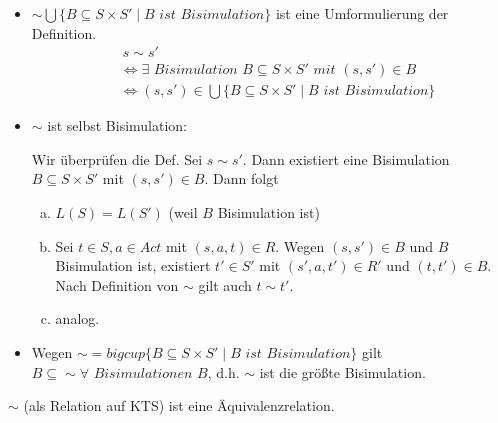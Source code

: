 \begin{beweis}
	\mbox{}
	\begin{itemize}
		\item $\sim \bigcup \{B \subseteq S \times S' \mid B \textit{ ist Bisimulation}\}$ ist eine Umformulierung der Definition.
		\begin{align*}
			&\ s \sim s'\\
			&\iff \exists \textit{ Bisimulation } B \subseteq S \times S' \textit{ mit } (s, s') \in B \\
			&\iff (s, s') \in \bigcup \{B \subseteq S \times S' \mid B \textit{ ist Bisimulation}\}
		\end{align*}
		
		\item $\sim$ ist selbst Bisimulation:
		
		Wir überprüfen die Def. Sei $s \sim s'$. Dann existiert eine Bisimulation $B \subseteq S \times S'$ mit $(s, s') \in B$. Dann folgt
		\begin{enumerate}[a)]
			\item $L(S) = L(S')$ (weil $B$ Bisimulation ist)
			\item Sei $t \in S, a \in Act$ mit $(s, a, t) \in R$. Wegen $(s, s') \in B$ und $B$ Bisimulation ist, existiert $t' \in S'$ mit $(s', a, t') \in R'$ und $(t, t') \in B$. Nach Definition von $\sim$ gilt auch $t \sim t'$.
			\item analog.
		\end{enumerate}
	
	\item Wegen $\sim = bigcup \{B \subseteq S \times S' \mid B \textit{ ist Bisimulation}\}$ gilt $B \subseteq \sim \forall \textit{ Bisimulationen } B$, d.h. $\sim$ ist die größte Bisimulation.
	\end{itemize}
\end{beweis}

\begin{lemma}
	$\sim$ (als Relation auf KTS) ist eine Äquivalenzrelation.
\end{lemma}

